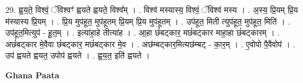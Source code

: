 \documentclass[17pt]{extarticle}
\begin{document}
29. ह्व॒य॒ते॒ विश्वं॒ ॅविश्वꣳ॑ ह्वयते ह्वयते॒ विश्व᳚म् । . विश्व॑ मस्यास्य॒ विश्वं॒ ॅविश्व॑ मस्य । . अ॒स्य॒ प्रि॒यम् प्रि॒य म॑स्यास्य प्रि॒यम् । . प्रि॒य मुप॑हूत॒ मुप॑हूतम् प्रि॒यम् प्रि॒य मुप॑हूतम् । . उप॑हूत॒ मिती त्युप॑हूत॒ मुप॑हूत॒ मिति॑ । . उप॑हूत॒मित्युप॑ - हू॒त॒म् । . इत्या॑हा॒हे तीत्या॑ह । . आ॒हा छं॑बट्कार॒ मछं॑बट्कार माहा॒हा छं॑बट्कारम् । . अछं॑बट्कार मे॒वैवा छं॑बट्कार॒ मछं॑बट्कार मे॒व । . अछ॑म्बट्कार॒मित्यछ॑म्बट् - का॒र॒म् । . ए॒वोपो पै॒वैवोप॑ । . उप॑ ह्वयते ह्वयत॒ उपोप॑ ह्वयते । . ह्व॒य॒त॒ इति॑ ह्वयते । \newline

\textbf{Ghana Paata } \newline
\end{document}
